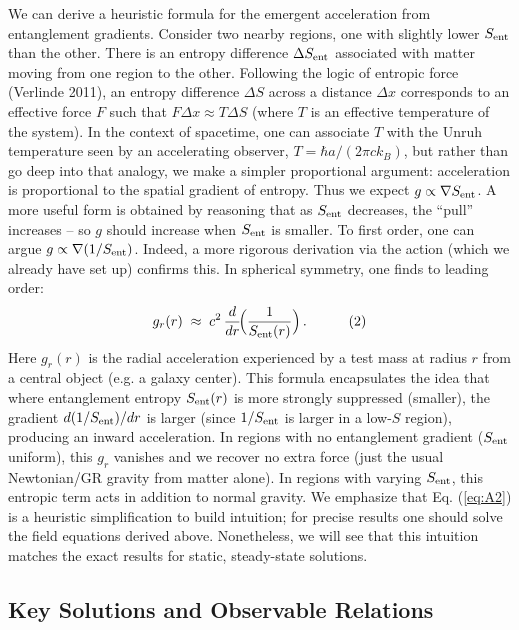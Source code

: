 \documentclass[11pt]{article}
\begin{document}
We can derive a heuristic formula for the emergent acceleration from entanglement gradients. Consider two nearby regions, one with slightly lower $S_{\rm ent}$ than the other. There is an entropy difference $\Delta S_{\rm ent}$ associated with matter moving from one region to the other. Following the logic of entropic force (Verlinde 2011), an entropy difference $\Delta S$ across a distance $\Delta x$ corresponds to an effective force $F$ such that $F \Delta x \approx T \Delta S$ (where $T$ is an effective temperature of the system). In the context of spacetime, one can associate $T$ with the Unruh temperature seen by an accelerating observer, $T = \hbar a/(2\pi c k_B)$, but rather than go deep into that analogy, we make a simpler proportional argument: acceleration is proportional to the spatial gradient of entropy. Thus we expect $g \propto \nabla S_{\rm ent}$. A more useful form is obtained by reasoning that as $S_{\rm ent}$ decreases, the “pull” increases – so $g$ should increase when $S_{\rm ent}$ is smaller. To first order, one can argue $g \propto \nabla(1/S_{\rm ent})$. Indeed, a more rigorous derivation via the action (which we already have set up) confirms this. In spherical symmetry, one finds to leading order:
\begin{equation} 
g_r(r) \;\approx\; c^2\,\frac{d}{dr}\!\Big(\frac{1}{S_{\rm ent}(r)}\Big)\,. \quad \tag{2} \label{eq:A2} 
\end{equation}
Here $g_r(r)$ is the radial acceleration experienced by a test mass at radius $r$ from a central object (e.g. a galaxy center). This formula encapsulates the idea that where entanglement entropy $S_{\rm ent}(r)$ is more strongly suppressed (smaller), the gradient $d(1/S_{\rm ent})/dr$ is larger (since $1/S_{\rm ent}$ is larger in a low-$S$ region), producing an inward acceleration​. In regions with no entanglement gradient ($S_{\rm ent}$ uniform), this $g_r$ vanishes and we recover no extra force (just the usual Newtonian/GR gravity from matter alone). In regions with varying $S_{\rm ent}$, this entropic term acts in addition to normal gravity. We emphasize that Eq. (\ref{eq:A2}) is a heuristic simplification to build intuition; for precise results one should solve the field equations derived above. Nonetheless, we will see that this intuition matches the exact results for static, steady-state solutions.

\subsection{Key Solutions and Observable Relations} %
\end{document}
